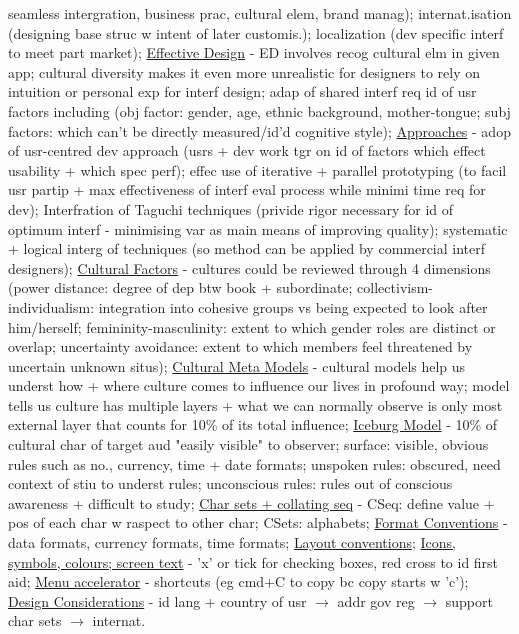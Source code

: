 \documentclass[a4paper]{article}
\begin{document}
\begin{multicols}{3}
        seamless intergration, business prac, cultural elem, brand manag); internat.isation (designing base struc w intent of later customis.); localization (dev specific interf to meet
        part market); \underline{Effective Design} - ED involves recog cultural elm in given app; cultural diversity makes it even more unrealistic for designers to rely on intuition or
        personal exp for interf design; adap of shared interf req id of usr factors including (obj factor: gender, age, ethnic background, mother-tongue; subj factors: which can't be directly
        measured/id'd cognitive style); \underline{Approaches} - adop of usr-centred dev approach (usrs + dev work tgr on id of factors which effect usability + which spec perf); effec
        use of iterative + parallel prototyping (to facil usr partip + max effectiveness of interf eval process while minimi time req for dev); Interfration of Taguchi techniques
        (privide rigor necessary for id of optimum interf - minimising var as main means of improving quality); systematic + logical interg of techniques (so method can be
        applied by commercial interf designers); \underline{Cultural Factors} - cultures could be reviewed through 4 dimensions (power distance: degree of dep btw book + subordinate;
        collectivism-individualism: integration into cohesive groups vs being expected to look after him/herself; femininity-masculinity: extent to which gender roles are distinct or overlap;
        uncertainty avoidance: extent to which members feel threatened by uncertain unknown situs); \underline{Cultural Meta Models} - cultural models help us underst how + where
        culture comes to influence our lives in profound way; model tells us  culture has multiple layers + what we can normally observe is only most external layer that counts for 10\%
        of its total influence; \underline{Iceburg Model} - 10\% of cultural char of target aud "easily visible" to observer; surface: visible, obvious rules such as no., currency,
        time + date formats; unspoken rules: obscured, need context of stiu to underst rules; unconscious rules: rules out of conscious awareness + difficult to study;
        \underline{Char sets + collating seq} - CSeq: define value + pos of each char w raspect to other char; CSets: alphabets; \underline{Format Conventions} - data formats, currency formats,
        time formats; \underline{Layout conventions}; \underline{Icons, symbols, colours; screen text} - 'x' or tick for checking boxes, red cross to id first aid; \underline{Menu accelerator}
        - shortcuts (eg cmd+C to copy bc copy starts w 'c'); \underline{Design Considerations} - id lang + country of usr $\to$ addr gov reg $\to$ support char sets $\to$ internat.

\end{multicols}
\end{document}
